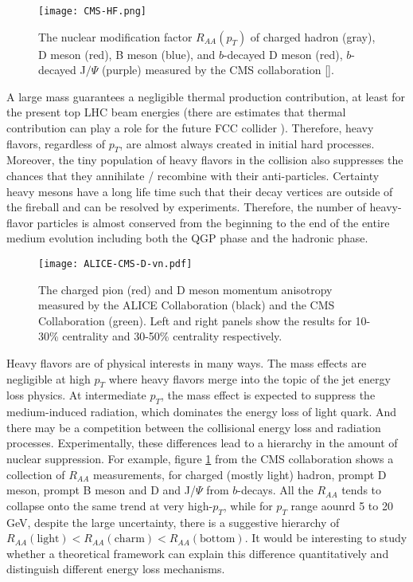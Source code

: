 \begin{figure}
\centering
\texttt{[image: CMS-HF.png]}
\caption{The nuclear modification factor $R_{AA}(p_T)$ of charged hadron (gray), D meson (red), B meson (blue), and $b$-decayed D meson (red), $b$-decayed J$/\Psi$ (purple) measured by the CMS collaboration [].}
\label{fig:intro:Raa}
\end{figure}

A large mass guarantees a negligible thermal production contribution, at least for the present top LHC beam energies (there are estimates that thermal contribution can play a role for the future FCC collider \cite{Zhou:2016wbo}).
Therefore, heavy flavors, regardless of $p_T$, are almost always created in initial hard processes.
Moreover, the tiny population of heavy flavors in the collision also suppresses the chances that they annihilate / recombine with their anti-particles.
Certainty heavy mesons have a long life time such that their decay vertices are outside of the fireball and can be resolved by experiments.
Therefore, the number of heavy-flavor particles is almost conserved from the beginning to the end of the entire medium evolution including both the QGP phase and the hadronic phase.

\begin{figure}
\centering
\texttt{[image: ALICE-CMS-D-vn.pdf]}
\caption{The charged pion (red) and D meson momentum anisotropy measured by the ALICE Collaboration (black) and the CMS Collaboration (green). Left and right panels show the results for 10-30\% centrality and 30-50\% centrality respectively.}
\label{fig:intro:D-vn}
\end{figure}

Heavy flavors are of physical interests in many ways.
The mass effects are negligible at high $p_T$ where heavy flavors merge into the topic of the jet energy loss physics.
At intermediate $p_T$, the mass effect is expected to suppress the medium-induced radiation, which dominates the energy loss of light quark.
And there may be a competition between the collisional energy loss and radiation processes.
Experimentally, these differences lead to a hierarchy in the amount of nuclear suppression.
For example, figure \ref{fig:intro:Raa} from the CMS collaboration shows a collection of $R_{AA}$ measurements, for charged (mostly light) hadron, prompt D meson, prompt B meson and D and J/$\Psi$ from $b$-decays.
All the $R_{AA}$ tends to collapse onto the same trend at very high-$p_T$, while for $p_T$ range aounrd 5 to 20 GeV, despite the large uncertainty, there is a suggestive hierarchy of $R_{AA}(\textrm{light}) < R_{AA}(\textrm{charm}) < R_{AA}(\textrm{bottom})$.
It would be interesting to study whether a theoretical framework can explain this difference quantitatively and distinguish different energy loss mechanisms.


